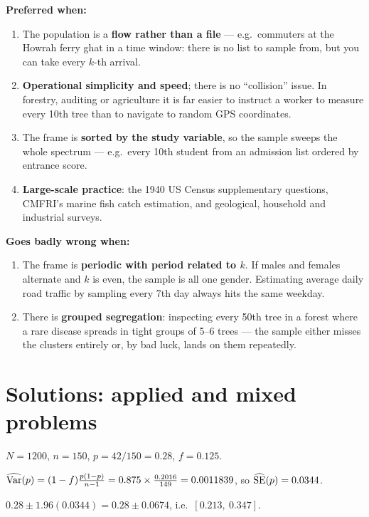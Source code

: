 \sol \textbf{Preferred when:}
\begin{enumerate}
  \item The population is a \textbf{flow rather than a file} --- e.g.\ commuters at the Howrah
        ferry ghat in a time window: there is no list to sample from, but you can take every
        $k$-th arrival.
  \item \textbf{Operational simplicity and speed}; there is no ``collision'' issue. In forestry,
        auditing or agriculture it is far easier to instruct a worker to measure every 10th tree
        than to navigate to random GPS coordinates.
  \item The frame is \textbf{sorted by the study variable}, so the sample sweeps the whole
        spectrum --- e.g.\ every 10th student from an admission list ordered by entrance score.
  \item \textbf{Large-scale practice}: the 1940 US Census supplementary questions, CMFRI's marine
        fish catch estimation, and geological, household and industrial surveys.
\end{enumerate}
\textbf{Goes badly wrong when:}
\begin{enumerate}
  \item The frame is \textbf{periodic with period related to $k$}. If males and females alternate
        and $k$ is even, the sample is all one gender. Estimating average daily road traffic by
        sampling every 7th day always hits the same weekday.
  \item There is \textbf{grouped segregation}: inspecting every 50th tree in a forest where a rare
        disease spreads in tight groups of 5--6 trees --- the sample either misses the clusters
        entirely or, by bad luck, lands on them repeatedly.
\end{enumerate}

\section{Solutions: applied and mixed problems}
\setcounter{qq}{0}

\sol $N=1200$, $n=150$, $p=42/150=0.28$, $f=0.125$.

 $\widehat{\operatorname{Var}}(p)=(1-f)\frac{p(1-p)}{n-1}=0.875\times\frac{0.2016}{149}=0.0011839$, so
$\widehat{\operatorname{SE}}(p)=0.0344$.

 $0.28\pm1.96(0.0344)=0.28\pm0.0674$, i.e.\ $\boxed{[0.213,\ 0.347]}$.

